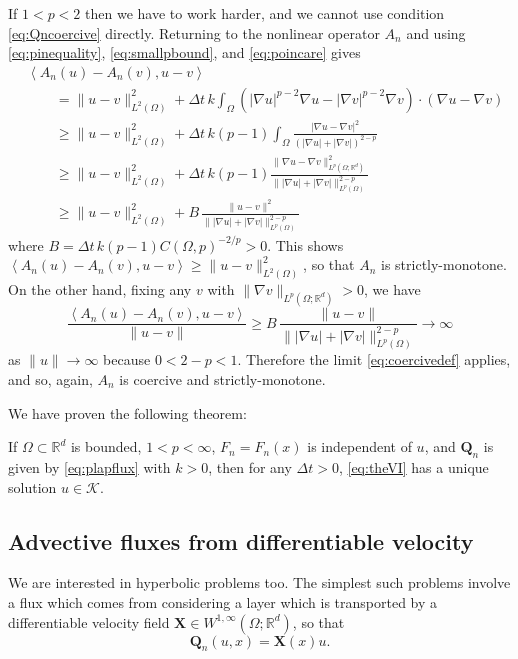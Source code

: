 \documentclass[final,leqno,onefignum,onetabnum]{siamltex1213bueler}
\newcommand\bQ{\mathbf{Q}}
\newcommand\bX{\mathbf{X}}
\renewcommand{\grad}{\nabla}
\newcommand{\ip}[2]{\ensuremath{\left<#1,#2\right>}}
\newcommand\RR{\mathbb{R}}
\begin{document}
If $1<p<2$ then we have to work harder, and we cannot use condition \eqref{eq:Qncoercive} directly.  Returning to the nonlinear operator $A_n$ and using \eqref{eq:pinequality}, \eqref{eq:smallpbound}, and \eqref{eq:poincare} gives
\begin{align*}
  &\ip{A_n(u) - A_n(v)}{u-v} \\
  &\qquad = \|u-v\|_{L^2(\Omega)}^2 + \Delta t\,k \int_\Omega \left(|\grad u|^{p-2} \grad u - |\grad v|^{p-2} \grad v\right)\cdot (\grad u - \grad v) \\
  &\qquad \ge \|u-v\|_{L^2(\Omega)}^2 + \Delta t\,k (p-1) \int_\Omega \frac{|\grad u - \grad v|^2}{\left(|\grad u|+|\grad v|\right)^{2-p}} \\
  &\qquad \ge \|u-v\|_{L^2(\Omega)}^2 + \Delta t\,k (p-1) \frac{\|\grad u - \grad v\|_{L^p(\Omega; \RR^d)}^2}{\big\||\grad u|+|\grad v|\big\|_{L^p(\Omega)}^{2-p}} \\
  &\qquad \ge \|u-v\|_{L^2(\Omega)}^2 + B\, \frac{\|u - v\|^2}{\big\||\grad u|+|\grad v|\big\|_{L^p(\Omega)}^{2-p}}
\end{align*}
where $B = \Delta t\,k (p-1) C(\Omega,p)^{-2/p} >0$.  This shows $\ip{A_n(u) - A_n(v)}{u-v} \ge \|u-v\|_{L^2(\Omega)}^2$, so that $A_n$ is strictly-monotone.  On the other hand, fixing any $v$ with $\|\grad v\|_{L^p(\Omega;\RR^d)} >0$, we have
\begin{equation*}
\frac{\ip{A_n(u) - A_n(v)}{u-v}}{\|u-v\|} \ge B\, \frac{\|u - v\|}{\big\||\grad u|+|\grad v|\big\|_{L^p(\Omega)}^{2-p}} \to \infty
\end{equation*}
as $\|u\|\to\infty$ because $0<2-p<1$.  Therefore the limit \eqref{eq:coercivedef} applies, and so, again, $A_n$  is coercive and strictly-monotone.

We have proven the following theorem:

\medskip
\begin{theorem}  \label{thm:plapwellposed}  If $\Omega\subset \RR^d$ is bounded, $1<p<\infty$, $F_n=F_n(x)$ is independent of $u$, and $\bQ_n$ is given by \eqref{eq:plapflux} with $k>0$, then for any $\Delta t>0$, \eqref{eq:theVI} has a unique solution $u\in\mathcal{K}$.
\end{theorem}

\subsection{Advective fluxes from differentiable velocity} \label{subsec:advect}  We are interested in hyperbolic problems too.  The simplest such problems involve a flux which comes from considering a layer which is transported by a differentiable velocity field $\bX \in W^{1,\infty}(\Omega;\RR^d)$, so that
\begin{equation}
  \bQ_n(u,x) = \bX(x) u. \label{eq:advectflux}
\end{equation}
\end{document}
